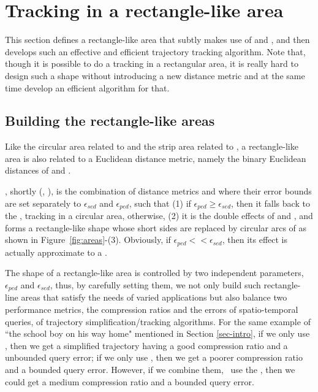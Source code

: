 

\section{Tracking in a rectangle-like area}
\label{sec:rectangle}
This section defines a rectangle-like area that subtly makes use of \ped and \sed, and then develops such an effective and efficient trajectory tracking algorithm.
Note that, though it is possible to do a tracking in a rectangular area, it is really hard to design such a shape without introducing a new distance metric and at the same time develop an efficient algorithm for that. 

\subsection{Building the rectangle-like areas}

Like the circular area related to \sed and the strip area related to \ped, a rectangle-like area is also related to a Euclidean distance metric, namely the binary Euclidean distances of \sed and \ped.

, shortly \bed (\sed, \ped), is the combination of distance metrics \sed and \ped where their error bounds are set separately to $\epsilon_{sed}$ and $\epsilon_{ped}$, such that (1) if $\epsilon_{ped} \ge \epsilon_{sed}$, then it falls back to the \sed, \ie tracking in a circular area, otherwise, (2) it is the double effects of \ped and \sed, and forms a rectangle-like shape whose short sides are replaced by circular arcs of \sed as shown in {Figure~\ref{fig:areas}-(3)}. Obviously, if $\epsilon_{ped} << \epsilon_{sed}$, then its effect is actually approximate to a \ped.

The shape of a rectangle-like area is controlled by two independent parameters, $\epsilon_{ped}$ and $\epsilon_{sed}$, thus, by carefully setting them, we not only build such rectangle-line areas that satisfy the needs of varied applications but also balance two performance metrics, the compression ratios and the errors of spatio-temporal queries, of trajectory simplification/tracking algorithms. 
For the same example of ``the school boy on his way home" mentioned in Section \ref{sec-intro}, if we only use \ped, then we get a simplified trajectory having a good compression ratio and a unbounded query error; if we only use \sed, then we get a poorer compression ratio and a bounded query error. However, if we combine them, \ie~use the \bed, then we could get a medium compression ratio and a bounded query error.



